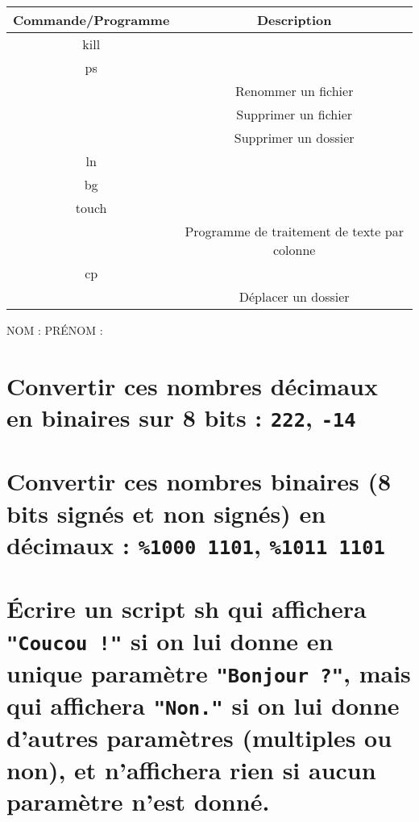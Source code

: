 \documentclass[11pt,a4paper]{article}
\begin{document}
\renewcommand\arraystretch{2.5}

\bigskip
\begin{center}
  \begin{tabular}{| c | c |}
  \hline
  \textbf{Commande/Programme} & \textbf{Description} \\ \hline
  kill & \\ \hline
  ps & \\ \hline
  & Renommer un fichier \\ \hline
  & Supprimer un fichier \\ \hline
  & Supprimer un dossier \\ \hline
  ln & \\ \hline
  bg & \\ \hline
  touch & \\ \hline
  & Programme de traitement de texte par colonne \\ \hline
  cp & \\ \hline
  & Déplacer un dossier \\
  \hline
  \end{tabular}
\end{center}
\bigskip

\renewcommand\arraystretch{1}

\newpage

NOM : \hspace{6.5cm} PR\'ENOM :

\section{Convertir ces nombres décimaux en binaires sur 8 bits : \texttt{222}, \texttt{-14}}

\bigskip
\bigskip
\bigskip

\section{Convertir ces nombres binaires (8 bits signés et non signés) en décimaux : \texttt{\%1000 1101}, \texttt{\%1011 1101}}

\bigskip
\bigskip
\bigskip
\bigskip

\section{\'Ecrire un script sh qui affichera \texttt{"Coucou !"} si on lui donne en unique paramètre \texttt{"Bonjour ?"}, mais qui affichera \texttt{"Non."} si on lui donne d'autres paramètres (multiples ou non), et n'affichera rien si aucun paramètre n'est donné.}

\bigskip
\bigskip
\bigskip
\bigskip
\bigskip
\bigskip
\bigskip
\bigskip
\bigskip
\bigskip
\end{document}
